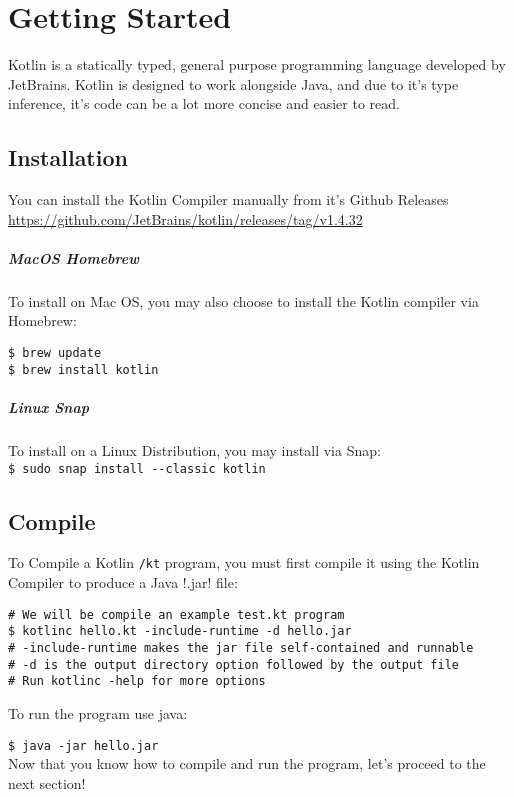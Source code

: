 \chapter{Getting Started}
Kotlin is a statically typed, general purpose programming language developed by JetBrains. Kotlin is 
designed to work alongside Java, and due to it's type inference, it's code can be a lot more concise and 
easier to read. 

\section{Installation}
You can install the Kotlin Compiler manually from it's Github Releases 
\\
\url{https://github.com/JetBrains/kotlin/releases/tag/v1.4.32}

\paragraph{MacOS Homebrew}
To install on Mac OS, you may also choose to install the Kotlin compiler via Homebrew: 
\begin{verbatim}
$ brew update
$ brew install kotlin
\end{verbatim}


\paragraph{Linux Snap}
To  install on a Linux Distribution, you may install via Snap:
\\
\verb!$ sudo snap install --classic kotlin!

\newpage

\section{Compile}
To Compile a Kotlin \verb!/kt! program, you must first compile it using the 
Kotlin Compiler to produce a Java !.jar! file:

\begin{verbatim}
# We will be compile an example test.kt program
$ kotlinc hello.kt -include-runtime -d hello.jar
# -include-runtime makes the jar file self-contained and runnable 
# -d is the output directory option followed by the output file
# Run kotlinc -help for more options
\end{verbatim}

To run the program use java:

\verb!$ java -jar hello.jar!
\\
Now that you know how to compile and run the program, let's proceed to the next section!

